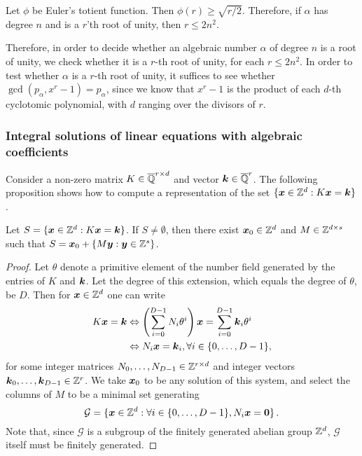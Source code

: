 \begin{lemma}
    Let $\phi$ be Euler's totient function. Then $\phi(r)\geq\sqrt{r/2}$. Therefore, if $\alpha$ has degree $n$ and is a $r$'th root of unity, then $r\leq 2n^2$.
\end{lemma}

Therefore, in order to decide whether an algebraic number $\alpha$ of degree $n$ is a root of unity, we check whether it is a $r$-th root of unity, for each $r\leq 2n^2$. In order to test whether $\alpha$ is a $r$-th root of unity, it suffices to see whether $\gcd(p_\alpha,x^r-1)=p_\alpha$, since we know that $x^r-1$ is the product of each $d$-th cyclotomic polynomial, with $d$ ranging over the divisors of $r$.

\subsubsection{Integral solutions of linear equations with algebraic coefficients}

Consider a non-zero matrix $K\in\overline{\mathbb{Q}}^{r\times d}$ and vector $\boldsymbol{k} \in \overline{\mathbb{Q}}^r$.  The following proposition shows how to compute a representation of the set $\lbrace \boldsymbol{x} \in \mathbb{Z}^{d} : K\boldsymbol{x} = \boldsymbol{k} \rbrace$.

\begin{proposition}
  Let $S = \lbrace \boldsymbol{x}\in\mathbb{Z}^{d} : K\boldsymbol{x} =
  \boldsymbol{k} \rbrace$. If $S \neq \emptyset$, then there exist
  $\boldsymbol{x}_{0} \in \mathbb{Z}^{d}$ and $M \in \mathbb{Z}^{d \times s}$ such that
  $S = \boldsymbol{x}_{0} + \lbrace M \boldsymbol{y} : \boldsymbol{y} \in \mathbb{Z}^s \rbrace$.
\end{proposition}

\begin{proof}
  Let $\theta$ denote a primitive element of the number field
  generated by the entries of $K$ and $\boldsymbol{k}$. Let the degree of this extension, which equals the degree of $\theta$, be $D$. Then for $\boldsymbol{x} \in \mathbb{Z}^{d}$ one can write
\begin{align*}
K \boldsymbol{x} = \boldsymbol{k} &\Leftrightarrow \left( \sum \limits_{i=0}^{D-1} N_{i} \theta^{i} \right) \boldsymbol{x} = \sum \limits_{i=0}^{D-1} \boldsymbol{k}_{i} \theta^{i} \\
&\Leftrightarrow N_{i} \boldsymbol{x} = \boldsymbol{k}_{i}, \forall i \in \lbrace 0, \ldots, D-1 \rbrace ,
\end{align*}
for some integer matrices $N_{0}, \ldots, N_{D-1} \in \mathbb{Z}^{r \times d}$ and integer vectors $\boldsymbol{k}_{0}, \ldots, \boldsymbol{k}_{D-1} \in \mathbb{Z}^{r}$.
We take $\boldsymbol{x}_{0}$ to be any solution of this system, and select the columns of $M$ to be a minimal set generating
\begin{equation*}
\mathcal{G} = \lbrace \boldsymbol{x} \in \mathbb{Z}^{d} : \forall i \in \lbrace 0, \ldots, D-1 \rbrace, N_{i} \boldsymbol{x} = \boldsymbol{0} \rbrace \, .
\end{equation*}
Note that, since $\mathcal{G}$ is a subgroup of the finitely generated abelian group $\mathbb{Z}^{d}$, $\mathcal{G}$ itself must be finitely generated.
\end{proof}

